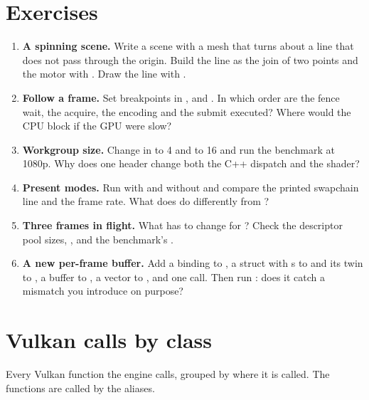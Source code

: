 \documentclass[11pt,a4paper]{article}
\begin{document}
\section{Exercises}

\begin{enumerate}[leftmargin=1.5em, itemsep=6pt]
  \item \textbf{A spinning scene.} Write a scene with a mesh that turns about a line that does not pass through the origin. Build the line as the join of two points and the motor with . Draw the line with .
  \item \textbf{Follow a frame.} Set breakpoints in ,  and . In which order are the fence wait, the acquire, the encoding and the submit executed? Where would the CPU block if the GPU were slow?
  \item \textbf{Workgroup size.} Change  in  to 4 and to 16 and run the benchmark at 1080p. Why does one header change both the C++ dispatch and the shader?
  \item \textbf{Present modes.} Run with and without  and compare the printed swapchain line and the frame rate. What does  do differently from ?
  \item \textbf{Three frames in flight.} What has to change for ? Check the descriptor pool sizes, ,  and the benchmark's .
  \item \textbf{A new per-frame buffer.} Add a binding to , a struct with s to  and its twin to , a buffer to , a vector to , and one  call. Then run : does it catch a mismatch you introduce on purpose?
\end{enumerate}

\appendix
\section{Vulkan calls by class}

Every Vulkan function the engine calls, grouped by where it is called. The  functions are called by the  aliases.
\end{document}
